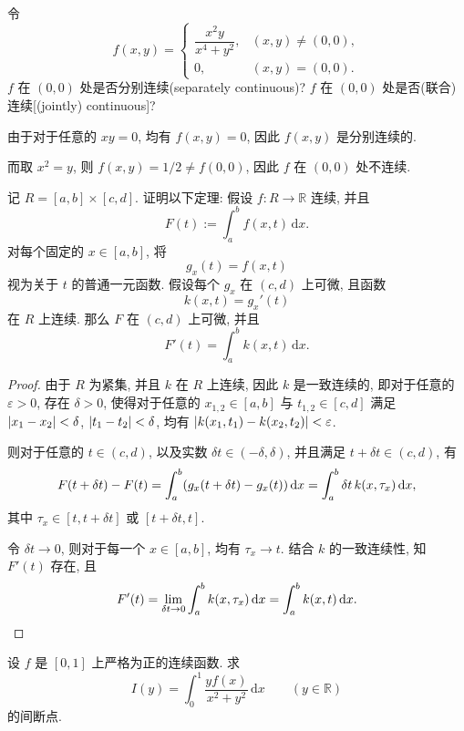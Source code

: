 \documentclass{article}
\begin{document}
\begin{problem}
  令
  \[
    f(x,y)=
    \begin{cases}
      \dfrac{x^2y}{x^4+y^2}, & (x,y)\ne(0,0),\\
      0, & (x,y)=(0,0).
    \end{cases}
  \]
  $f$ 在 $(0,0)$ 处是否分别连续(separately continuous)? $f$ 在 $(0,0)$ 处是否(联合)连续[(jointly) continuous]?
\end{problem}

\begin{solution}
	由于对于任意的 $xy=0$, 均有 $f(x,y)=0$, 因此 $f(x,y)$ 是分别连续的.

	而取 $x^2=y$, 则 $f(x,y) = 1/2 \neq f(0,0)$, 因此 $f$ 在 $(0,0)$ 处不连续.
\end{solution}



\begin{problem}
  记 $R=[a,b]\times[c,d]$. 证明以下定理: 假设 $f:R\to\mathbb{R}$ 连续, 并且
  \[
    F(t):=\int_a^b f(x,t)\,\mathrm{d}x.
  \]
  对每个固定的 $x\in[a,b]$, 将
  \[
    g_x(t)=f(x,t)
  \]
  视为关于 $t$ 的普通一元函数. 假设每个 $g_x$ 在 $(c,d)$ 上可微, 且函数
  \[
    k(x,t)=g_x'(t)
  \]
  在 $R$ 上连续. 那么 $F$ 在 $(c,d)$ 上可微, 并且
  \[
    F'(t)=\int_a^b k(x,t)\,\mathrm{d}x.
  \]
\end{problem}

\begin{proof}
	由于 $R$ 为紧集, 并且 $k$ 在 $R$ 上连续, 因此 $k$ 是一致连续的, 即对于任意的 $\varepsilon>0$, 存在 $\delta>0$, 使得对于任意的 $x_{1,2}\in [a,b]$ 与 $t_{1,2} \in [c,d]$ 满足 $\left|x_1-x_2\right|<\delta$, $\left|t_1-t_2\right|<\delta$, 均有 $\left|k(x_1,t_1) - k(x_2,t_2)\right|<\varepsilon$. 

	则对于任意的 $t\in (c,d)$, 以及实数 $\delta t \in (-\delta,\delta)$, 并且满足 $t+\delta t \in (c,d)$, 有
	\[ F(t+\delta t)-F(t) = \int_{a}^{b} (g_x(t+\delta t)-g_x(t))\,\mathrm{d} x = \int_{a}^{b}\delta t \,k(x,\tau_x) \,\mathrm{d} x, \]
	其中 $\tau_x \in [t,t+\delta t]$ 或 $[t+\delta t,t]$. 
	
	令 $\delta t \to 0$, 则对于每一个 $x\in[a,b]$, 均有 $\tau_x \to t$. 结合 $k$ 的一致连续性, 知 $F'(t)$ 存在, 且
	\[ F'(t) = \lim_{\delta t\to 0} \int_{a}^{b} k(x,\tau_x) \,\mathrm{d} x = \int_{a}^{b} k(x,t) \,\mathrm{d} x. \]
\end{proof}



\begin{problem}
  设 $f$ 是 $[0,1]$ 上严格为正的连续函数. 求
  \[
    I(y)=\int_0^1 \frac{y f(x)}{x^2+y^2}\,\mathrm{d}x
    \qquad (y\in\mathbb{R})
  \]
  的间断点.
\end{problem}
\end{document}
